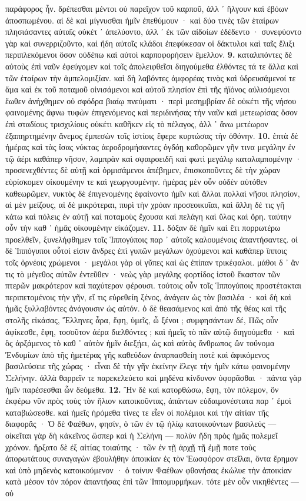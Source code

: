 \documentclass[a4paper, 11pt, oneside, polutonikogreek, german]{article}
\begin{document}
παράφορος ἦν. δρέπεσθαι μέντοι οὐ παρεῖχον τοῦ καρποῦ, ἀλλ ᾽ ἤλγουν καὶ ἐβόων ἀποσπωμένου. αἱ δὲ καὶ μίγνυσθαι ἡμῖν ἐπεθύμουν · καὶ δύο τινὲς τῶν ἑταίρων πλησιάσαντες αὐταῖς οὐκέτ ᾽ ἀπελύοντο, ἀλλ ᾽ ἐκ τῶν αἰδοίων ἐδέδεντο · συνεφύοντο γὰρ καὶ συνερριζοῦντο, καὶ ἤδη αὐτοῖς κλάδοι ἐπεφύκεσαν οἱ δάκτυλοι καὶ ταῖς ἕλιξι περιπλεκόμενοι ὅσον οὐδέπω καὶ αὐτοὶ καρποφορήσειν ἔμελλον. \textbf{9.} καταλιπόντες δὲ αὐτοὺς ἐπὶ ναῦν ἐφεύγομεν καὶ τοῖς ἀπολειφθεῖσι διηγούμεθα ἐλθόντες τά τε ἄλλα καὶ τῶν ἑταίρων τὴν ἀμπελομιξίαν. καὶ δὴ λαβόντες ἀμφορέας τινὰς καὶ ὑδρευσάμενοί τε ἅμα καὶ ἐκ τοῦ ποταμοῦ οἰνισάμενοι καὶ αὐτοῦ πλησίον ἐπὶ τῆς ἠϊόνος αὐλισάμενοι ἕωθεν ἀνήχθημεν οὐ σφόδρα βιαίῳ πνεύματι · περὶ μεσημβρίαν δὲ οὐκέτι τῆς νήσου φαινομένης ἄφνω τυφὼν ἐπιγενόμενος καὶ περιδινήσας τὴν ναῦν καὶ μετεωρίσας ὅσον ἐπὶ σταδίους τρισχιλίους οὐκέτι καθῆκεν εἰς τὸ πέλαγος, ἀλλ ᾽ ἄνω μετέωρον ἐξαπηρτημένην ἄνεμος ἐμπεσὼν τοῖς ἱστίοις ἔφερε κυρτώσας τὴν ὀθόνην. \textbf{10.} ἑπτὰ δὲ ἡμέρας καὶ τὰς ἴσας νύκτας ἀεροδρομήσαντες ὀγδόῃ καθορῶμεν γῆν τινα μεγάλην ἐν τῷ ἀέρι καθάπερ νῆσον, λαμπρὰν καὶ σφαιροειδῆ καὶ φωτὶ μεγάλῳ καταλαμπομένην · προσενεχθέντες δὲ αὐτῇ καὶ ὁρμισάμενοι ἀπέβημεν, ἐπισκοποῦντες δὲ τὴν χώραν εὑρίσκομεν οἰκουμένην τε καὶ γεωργουμένην. ἡμέρας μὲν οὖν οὐδὲν αὐτόθεν καθεωρῶμεν, νυκτὸς δὲ ἐπιγενομένης ἐφαίνοντο ἡμῖν καὶ ἄλλαι πολλαὶ νῆσοι πλησίον, αἱ μὲν μείζους, αἱ δὲ μικρότεραι, πυρὶ τὴν χρόαν προσεοικυῖαι, καὶ ἄλλη δέ τις γῆ κάτω καὶ πόλεις ἐν αὑτῇ καὶ ποταμοὺς ἔχουσα καὶ πελάγη καὶ ὕλας καὶ ὄρη. ταύτην οὖν τὴν καθ ᾽ ἡμἄς οἰκουμένην εἰκάζομεν. \textbf{11.} δόξαν δὲ ἡμῖν καὶ ἔτι πορρωτέρω προελθεῖν, ξυνελήφθημεν τοῖς Ἱππογύποις παρ ᾽ αὐτοῖς καλουμένοις ἀπαντήσαντες. οἱ δὲ Ἱππόγυποι οὗτοί εἰσιν ἄνδρες ἐπὶ γυπῶν μεγάλων ὀχούμενοι καὶ καθάπερ ἵπποις τοῖς ὀρνέοις χρώμενοι · μεγάλοι γὰρ οἱ γῦπες καὶ ὡς ἐπίπαν τρικέφαλοι. μάθοι δ ᾽ ἄν τις τὸ μέγεθος αὐτῶν ἐντεῦθεν · νεὼς γὰρ μεγάλης φορτίδος ἱστοῦ ἕκαστον τῶν πτερῶν μακρότερον καὶ παχύτερον φέρουσι. τούτοις οὖν τοῖς Ἱππογύποις προστέτακται περιπετομένοις τὴν γῆν, εἴ τις εὑρεθείη ξένος, ἀνάγειν ὡς τὸν βασιλέα · καὶ δὴ καὶ ἡμᾶς ξυλλαβόντες ἀνάγουσιν ὡς αὐτόν. ὁ δὲ θεασάμενος καὶ ἀπὸ τῆς θέας καὶ τῆς στολῆς εἰκάσας, Ἕλληνες ἆρα, ἔφη, ὑμεῖς, ὦ ξένοι ; συμφησάντων δέ, Πῶς οὖν ἀφίκεσθε, ἔφη, τοσοῦτον ἀέρα διελθόντες ; καὶ ἡμεῖς τὸ πᾶν αὐτῷ διηγούμεθα · καὶ ὃς ἀρξάμενος τὸ καθ ᾽ αὑτὸν ἡμῖν διεξῄει, ὡς καὶ αὐτὸς ἄνθρωπος ὢν τοὔνομα Ἐνδυμίων ἀπὸ τῆς ἡμετέρας γῆς καθεύδων ἀναρπασθείη ποτὲ καὶ ἀφικόμενος βασιλεύσειε τῆς χώρας · εἶναι δὲ τὴν γῆν ἐκείνην ἔλεγε τὴν ἡμῖν κάτω φαινομένην Σελήνην. ἀλλὰ θαρρεῖν τε παρεκελεύετο καὶ μηδένα κίνδυνον ὑφορᾶσθαι · πάντα γὰρ ἡμῖν παρέσεσθαι ὧν δεόμεθα. \textbf{12.} Ἢν δὲ καὶ κατορθώσω, ἔφη, τὸν πόλεμον, ὃν ἐκφέρω νῦν πρὸς τοὺς τὸν ἥλιον κατοικοῦντας, ἁπάντων εὐδαιμονέστατα παρ ᾽ ἐμοὶ καταβιώσεσθε. καὶ ἡμεῖς ἠρόμεθα τίνες τε εἶεν οἱ πολέμιοι καὶ τὴν αἰτίαν τῆς διαφορἄς · Ὁ δὲ Φαέθων, φησίν, ὁ τῶν ἐν τῷ ἡλίῳ κατοικούντων βασιλεύς --- οἰκεῖται γὰρ δὴ κἀκεῖνος ὥσπερ καὶ ἡ Σελήνη --- πολὺν ἤδη πρὸς ἡμᾶς πολεμεῖ χρόνον. ἤρξατο δὲ ἐξ αἰτίας τοιαύτης · τῶν ἐν τῇ ἀρχῇ τῇ ἐμῇ ποτε τοὺς ἀπορωτάτους συναγαγὼν ἐβουλήθην ἀποικίαν ἐς τὸν Ἑωσφόρον στεῖλαι, ὄντα ἔρημον καὶ ὑπὸ μηδενὸς κατοικούμενον · ὁ τοίνυν Φαέθων φθονήσας ἐκώλυε τὴν ἀποικίαν κατὰ μέσον τὸν πόρον ἀπαντήσας ἐπὶ τῶν Ἱππομυρμήκων. τότε μὲν οὖν νικηθέντες --- οὐ 
\end{document}
